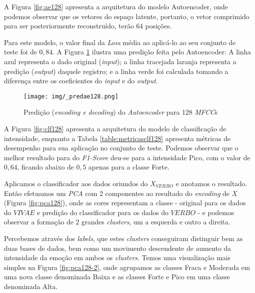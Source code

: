
A Figura \ref{fig:ae128} apresenta a arquitetura do modelo Autoencoder, onde podemos observar que os vetores do espaço latente, portanto, o vetor comprimido para ser posteriormente reconstruído, terão $64$ posições.

Para este modelo, o valor final da \textit{Loss} média ao aplicá-lo ao seu conjunto de teste foi de $0,84$. A Figura \ref{fig:predae128} ilustra uma predição feita pelo Autoencoder: A linha azul representa o dado original (\textit{input}); a linha tracejada laranja representa a predição (\textit{output}) daquele registro; e a linha verde foi calculada tomando a diferença entre os coeficientes do \textit{input} e do \textit{output}.

    \begin{figure}[t]
    \centering
    \texttt{[image: img/\_predae128.png]}
    \caption{\label{fig:predae128}Predição (\textit{encoding e decoding}) do \textit{Autoencoder} para 128 \textit{MFCC}s}
\end{figure}

A Figura \ref{fig:clf128} apresenta a arquitetura do modelo de classificação de intensidade, enquanto a Tabela \ref{table:metricasclf128} apresenta métricas de desempenho para sua aplicação no conjunto de teste. Podemos observar que o melhor resultado para do \textit{F1-Score} deu-se para a intensidade Pico, com o valor de $0,64$, ficando abaixo de $0,5$ apenas para a classe Forte.

Aplicamos o classificador aos dados oriundos do $X_{VERBO}$ e anotamos o resultado. Então efetuamos um \textit{PCA} com 2 componentes ao resultado do \textit{encoding} de $X$ (Figura \ref{fig:pca128}), onde as cores representam a classe - original para os dados do $VIVAE$ e predição do classificador para os dados do $VERBO$ - e podemos observar a formação de 2 grandes \textit{clusters}, um a esquerda e outro a direita.

Percebemos através dos \textit{labels}, que estes \textit{clusters} conseguiram distinguir bem as duas bases de dados, bem como um movimento descendente de aumento da intensidade da emoção em ambos os \textit{clusters}. Temos uma visualização mais simples na Figura \ref{fig:pca128-2}, onde agrupamos as classes Fraca e Moderada em uma nova classe denominada Baixa e as classes Forte e Pico em uma classe denominada Alta.

